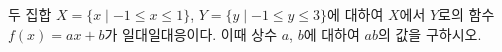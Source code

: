 두 집합 $X=\{x \mid -1\le x\le 1\}$, $Y=\{y \mid -1\le y\le 3\}$에 대하여 $X$에서 $Y$로의 함수 $f(x)=ax+b$가 일대일대응이다. 이때 상수 $a$, $b$에 대하여 $ab$의 값을 구하시오. 
